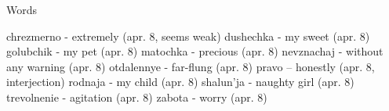 Words

chrezmerno - extremely (apr. 8, seems weak)
dushechka - my sweet (apr. 8)
golubchik - my pet (apr. 8)
matochka - precious (apr. 8)
nevznachaj - without any warning (apr. 8)
otdalennye - far-flung (apr. 8)
pravo -- honestly (apr. 8, interjection)
rodnaja - my child (apr. 8)
shalun'ja - naughty girl (apr. 8)
trevolnenie - agitation (apr. 8)
zabota - worry (apr. 8)